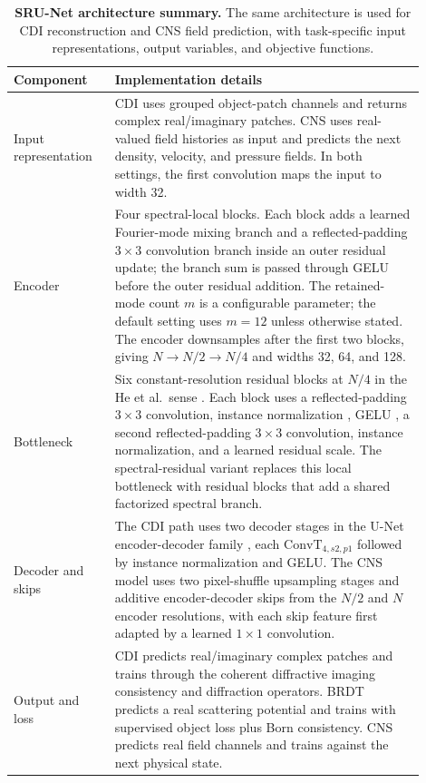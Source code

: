 \documentclass[11pt]{article}
\begin{document}
\begin{table}[h]
\centering
\small
\caption{\textbf{SRU-Net architecture summary.} The same architecture is used
for CDI reconstruction and CNS field prediction, with task-specific input
representations, output variables, and objective functions.}
\label{tab:architecture_summary}
\begin{tabular}{p{0.22\linewidth}p{0.68\linewidth}}
\toprule
Component & Implementation details \\
\midrule
Input representation & CDI uses grouped object-patch channels and
returns complex real/imaginary patches. CNS uses real-valued field histories as
input and predicts the next density, velocity, and pressure fields. In both
settings, the first convolution maps the input to width 32. \\
Encoder & Four spectral-local blocks. Each block adds a learned Fourier-mode
mixing branch and a reflected-padding $3\times 3$ convolution branch inside an
outer residual update; the branch sum is passed through GELU before the outer
residual addition. The retained-mode count $m$ is a configurable parameter; the
default setting uses $m=12$ unless otherwise stated. The encoder
downsamples after the first two blocks, giving $N\to N/2\to N/4$ and widths
32, 64, and 128. \\
Bottleneck & Six constant-resolution residual blocks at $N/4$ in the He et
al.\ sense \cite{resnet}. Each block uses a reflected-padding $3\times 3$
convolution, instance normalization \cite{instnorm}, GELU \cite{gelu}, a
second reflected-padding $3\times 3$ convolution, instance normalization, and
a learned residual scale. The spectral-residual variant replaces this local
bottleneck with residual blocks that add a shared factorized spectral branch. \\
Decoder and skips & The CDI path uses two decoder stages in the U-Net
encoder-decoder family \cite{unet}, each $\mathrm{ConvT}_{4,s2,p1}$ followed
by instance normalization and GELU. The CNS model uses two pixel-shuffle
\cite{pixelshuffle} upsampling stages and additive encoder-decoder skips from
the $N/2$ and $N$ encoder resolutions, with each skip feature first adapted by
a learned $1\times1$ convolution. \\
Output and loss & CDI predicts real/imaginary complex patches and trains through
the coherent diffractive imaging consistency and diffraction operators. BRDT
predicts a real scattering potential and trains with supervised object loss
plus Born consistency. CNS predicts real field channels and trains against the
next physical state. \\
\bottomrule
\end{tabular}
\end{table}
\end{document}
